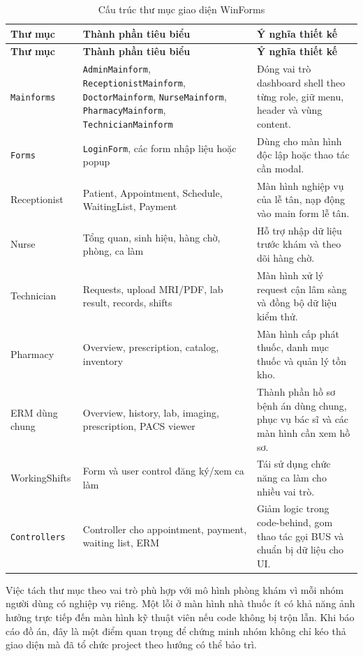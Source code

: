 \documentclass[12pt,a4paper]{article}
\numberwithin{figure}{subsection}
\numberwithin{table}{subsection}
\begin{document}
\begin{longtable}{|p{4cm}|p{4.4cm}|p{5.4cm}|}
\caption{Cấu trúc thư mục giao diện WinForms} \\
\hline
\textbf{Thư mục} & \textbf{Thành phần tiêu biểu} & \textbf{Ý nghĩa thiết kế} \\
\hline
\endfirsthead
\hline
\textbf{Thư mục} & \textbf{Thành phần tiêu biểu} & \textbf{Ý nghĩa thiết kế} \\
\hline
\endhead
\texttt{Mainforms} & \texttt{AdminMainform}, \texttt{ReceptionistMainform}, \texttt{DoctorMainform}, \texttt{NurseMainform}, \texttt{PharmacyMainform}, \texttt{TechnicianMainform} & Đóng vai trò dashboard shell theo từng role, giữ menu, header và vùng content. \\
\hline
\texttt{Forms} & \texttt{LoginForm}, các form nhập liệu hoặc popup & Dùng cho màn hình độc lập hoặc thao tác cần modal. \\
\hline
Receptionist & Patient, Appointment, Schedule, WaitingList, Payment & Màn hình nghiệp vụ của lễ tân, nạp động vào main form lễ tân. \\
\hline
Nurse & Tổng quan, sinh hiệu, hàng chờ, phòng, ca làm & Hỗ trợ nhập dữ liệu trước khám và theo dõi hàng chờ. \\
\hline
Technician & Requests, upload MRI/PDF, lab result, records, shifts & Màn hình xử lý request cận lâm sàng và đồng bộ dữ liệu kiểm thử. \\
\hline
Pharmacy & Overview, prescription, catalog, inventory & Màn hình cấp phát thuốc, danh mục thuốc và quản lý tồn kho. \\
\hline
ERM dùng chung & Overview, history, lab, imaging, prescription, PACS viewer & Thành phần hồ sơ bệnh án dùng chung, phục vụ bác sĩ và các màn hình cần xem hồ sơ. \\
\hline
WorkingShifts & Form và user control đăng ký/xem ca làm & Tái sử dụng chức năng ca làm cho nhiều vai trò. \\
\hline
\texttt{Controllers} & Controller cho appointment, payment, waiting list, ERM & Giảm logic trong code-behind, gom thao tác gọi BUS và chuẩn bị dữ liệu cho UI. \\
\hline
\end{longtable}

Việc tách thư mục theo vai trò phù hợp với mô hình phòng khám vì mỗi nhóm người dùng có nghiệp vụ riêng. Một lỗi ở màn hình nhà thuốc ít có khả năng ảnh hưởng trực tiếp đến màn hình kỹ thuật viên nếu code không bị trộn lẫn. Khi báo cáo đồ án, đây là một điểm quan trọng để chứng minh nhóm không chỉ kéo thả giao diện mà đã tổ chức project theo hướng có thể bảo trì.
\end{document}

